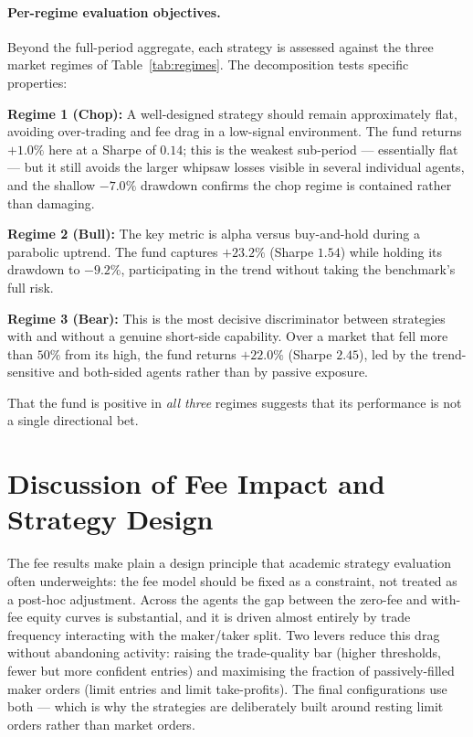 \paragraph{Per-regime evaluation objectives.}
Beyond the full-period aggregate, each strategy is assessed against the three market regimes of Table~\ref{tab:regimes}. The decomposition tests specific properties:

\textbf{Regime 1 (Chop):} A well-designed strategy should remain approximately flat, avoiding over-trading and fee drag in a low-signal environment. The fund returns $+1.0\%$ here at a Sharpe of $0.14$; this is the weakest sub-period --- essentially flat --- but it still avoids the larger whipsaw losses visible in several individual agents, and the shallow $-7.0\%$ drawdown confirms the chop regime is contained rather than damaging.


\textbf{Regime 2 (Bull):} The key metric is alpha versus buy-and-hold during a parabolic uptrend. The fund captures $+23.2\%$ (Sharpe $1.54$) while holding its drawdown to $-9.2\%$, participating in the trend without taking the benchmark's full risk.


\textbf{Regime 3 (Bear):} This is the most decisive discriminator between strategies with and without a genuine short-side capability. Over a market that fell more than $50\%$ from its high, the fund returns $+22.0\%$ (Sharpe $2.45$), led by the trend-sensitive and both-sided agents rather than by passive exposure.


That the fund is positive in \textit{all three} regimes suggests that its performance is not a single directional bet.

\section{Discussion of Fee Impact and Strategy Design}
\label{sec:fee_impact}

The fee results make plain a design principle that academic strategy evaluation often underweights: the fee model should be fixed as a constraint, not treated as a post-hoc adjustment. Across the agents the gap between the zero-fee and with-fee equity curves is substantial, and it is driven almost entirely by trade frequency interacting with the maker/taker split. Two levers reduce this drag without abandoning activity: raising the trade-quality bar (higher thresholds, fewer but more confident entries) and maximising the fraction of passively-filled maker orders (limit entries and limit take-profits). The final configurations use both --- which is why the strategies are deliberately built around resting limit orders rather than market orders.


